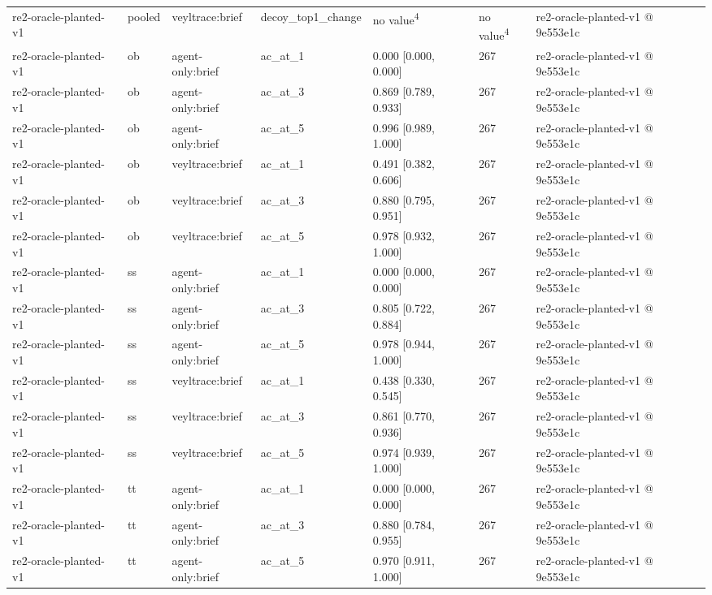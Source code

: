 \begin{table}[t]
\begin{tabular}{lllllll}
re2-oracle-planted-v1 & pooled & veyltrace:brief & decoy\_top1\_change & no value\textsuperscript{4} & no value\textsuperscript{4} & re2-oracle-planted-v1 @ 9e553e1c \\
re2-oracle-planted-v1 & ob & agent-only:brief & ac\_at\_1 & 0.000 [0.000, 0.000] & 267 & re2-oracle-planted-v1 @ 9e553e1c \\
re2-oracle-planted-v1 & ob & agent-only:brief & ac\_at\_3 & 0.869 [0.789, 0.933] & 267 & re2-oracle-planted-v1 @ 9e553e1c \\
re2-oracle-planted-v1 & ob & agent-only:brief & ac\_at\_5 & 0.996 [0.989, 1.000] & 267 & re2-oracle-planted-v1 @ 9e553e1c \\
re2-oracle-planted-v1 & ob & veyltrace:brief & ac\_at\_1 & 0.491 [0.382, 0.606] & 267 & re2-oracle-planted-v1 @ 9e553e1c \\
re2-oracle-planted-v1 & ob & veyltrace:brief & ac\_at\_3 & 0.880 [0.795, 0.951] & 267 & re2-oracle-planted-v1 @ 9e553e1c \\
re2-oracle-planted-v1 & ob & veyltrace:brief & ac\_at\_5 & 0.978 [0.932, 1.000] & 267 & re2-oracle-planted-v1 @ 9e553e1c \\
re2-oracle-planted-v1 & ss & agent-only:brief & ac\_at\_1 & 0.000 [0.000, 0.000] & 267 & re2-oracle-planted-v1 @ 9e553e1c \\
re2-oracle-planted-v1 & ss & agent-only:brief & ac\_at\_3 & 0.805 [0.722, 0.884] & 267 & re2-oracle-planted-v1 @ 9e553e1c \\
re2-oracle-planted-v1 & ss & agent-only:brief & ac\_at\_5 & 0.978 [0.944, 1.000] & 267 & re2-oracle-planted-v1 @ 9e553e1c \\
re2-oracle-planted-v1 & ss & veyltrace:brief & ac\_at\_1 & 0.438 [0.330, 0.545] & 267 & re2-oracle-planted-v1 @ 9e553e1c \\
re2-oracle-planted-v1 & ss & veyltrace:brief & ac\_at\_3 & 0.861 [0.770, 0.936] & 267 & re2-oracle-planted-v1 @ 9e553e1c \\
re2-oracle-planted-v1 & ss & veyltrace:brief & ac\_at\_5 & 0.974 [0.939, 1.000] & 267 & re2-oracle-planted-v1 @ 9e553e1c \\
re2-oracle-planted-v1 & tt & agent-only:brief & ac\_at\_1 & 0.000 [0.000, 0.000] & 267 & re2-oracle-planted-v1 @ 9e553e1c \\
re2-oracle-planted-v1 & tt & agent-only:brief & ac\_at\_3 & 0.880 [0.784, 0.955] & 267 & re2-oracle-planted-v1 @ 9e553e1c \\
re2-oracle-planted-v1 & tt & agent-only:brief & ac\_at\_5 & 0.970 [0.911, 1.000] & 267 & re2-oracle-planted-v1 @ 9e553e1c \\

\end{tabular}
\end{table}
